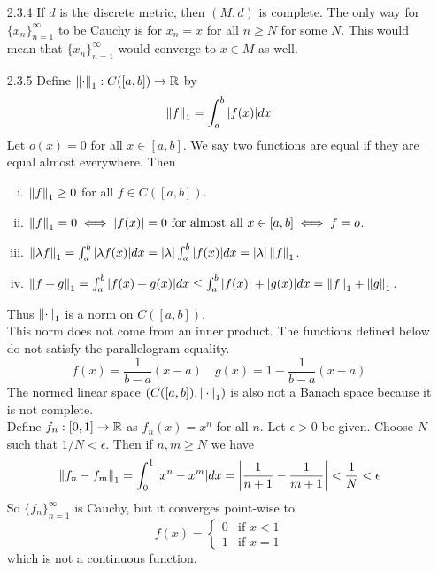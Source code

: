 \documentclass[../../Solutions.tex]{subfiles}
\begin{document}
\begin{itemize}
	
	\item [2.3.4] If $d$ is the discrete metric, then $(M,d)$ is complete.
		The only way for $\{x_n\}_{n=1}^\infty$ to be Cauchy is for $x_n = x$ for all $n \geq N$ for some $N$.
		This would mean that $\{x_n\}_{n=1}^\infty$ would converge to $x \in M$ as well.
	
	\item [2.3.5] Define $\left\lVert\cdot\right\rVert_1 : C([a,b]) \to \mathbb{R}$ by
		$$ \left\lVert f\right\rVert_1 = \int_a^b |f(x)| dx $$
		Let $o(x) = 0$ for all $x \in [a,b]$.
		We say two functions are equal if they are equal almost everywhere.
		Then
		\begin{enumerate}[(i)]
			\item $\left\lVert f\right\rVert_1 \geq 0$ for all $f \in C([a,b])$.
			\item $\left\lVert f\right\rVert_1 = 0 \iff |f(x)| = 0 \text{ for almost all } x \in [a,b] \iff f = o$.
			\item $\left\lVert\lambda f\right\rVert_1 = \int_a^b |\lambda f(x)| dx = |\lambda|\int_a^b|f(x)|dx = |\lambda|\left\lVert f\right\rVert_1$.
			\item $\left\lVert f+g\right\rVert_1 = \int_a^b |f(x)+g(x)|dx \leq \int_a^b|f(x)|+|g(x)|dx = \left\lVert f\right\rVert_1+\left\lVert g\right\rVert_1$.
		\end{enumerate}
		Thus $\left\lVert\cdot\right\rVert_1$ is a norm on $C([a,b])$. \\
		This norm does not come from an inner product.
		The functions defined below do not satisfy the parallelogram equality.
		$$ f(x) = \frac{1}{b-a}(x-a) \quad g(x) = 1-\frac{1}{b-a}(x-a) $$
		The normed linear space $(C([a,b]),\left\lVert\cdot\right\rVert_1)$ is also not a Banach space because it is not complete. \\
		Define $f_n:[0,1] \to \mathbb{R}$ as $f_n(x) = x^n$ for all $n$.
		Let $\epsilon > 0$ be given.
		Choose $N$ such that $1/N < \epsilon$.
		Then if $n,m \geq N$ we have
		$$ \left\lVert f_n-f_m\right\rVert_1 = \int_0^1|x^n-x^m|dx = \left|\frac{1}{n+1}-\frac{1}{m+1}\right| < \frac{1}{N} < \epsilon $$
		So $\{f_n\}_{n=1}^\infty$ is Cauchy, but it converges point-wise to
		$$ f(x) = \begin{cases}
			0 & \text{if } x < 1 \\
			1 & \text{if } x = 1
		\end{cases} $$
		which is not a continuous function.
	

\end{itemize}
\end{document}
